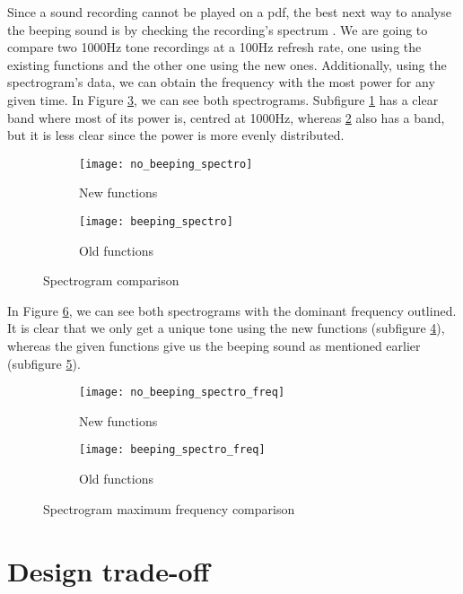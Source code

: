 Since a sound recording cannot be played on a pdf, the best next way to analyse the beeping sound is by checking the recording's spectrum . We are going to compare two 1000Hz tone recordings at a 100Hz refresh rate, one using the existing functions and the other one using the new ones. Additionally, using the spectrogram's data, we can obtain the frequency with the most power for any given time.
In Figure \ref{fig:spectro}, we can see both spectrograms. Subfigure \ref{fig:spectro_no_beep} has a clear band where most of its power is, centred at 1000Hz, whereas \ref{fig:spectro_beep} also has a band, but it is less clear since the power is more evenly distributed.
\begin{figure}[hbt!]
	\centering
	\begin{subfigure}{0.48\linewidth}
		\centering
		\texttt{[image: no\_beeping\_spectro]}
		\caption{New functions}
		\label{fig:spectro_no_beep}
	\end{subfigure}
	\begin{subfigure}{0.48\linewidth}
		\centering
		\texttt{[image: beeping\_spectro]}
		\caption{Old functions}
		\label{fig:spectro_beep}
	\end{subfigure}
	\caption{Spectrogram comparison}
	\label{fig:spectro}
\end{figure}

In Figure \ref{fig:spectro_freq}, we can see both spectrograms with the dominant frequency outlined. It is clear that we only get a unique tone using the new functions (subfigure \ref{fig:spectro_freq_no_beep}), whereas the given functions give us the beeping sound as mentioned earlier (subfigure \ref{fig:spectro_freq_beep}).

\begin{figure}[hbt!]
	\centering
	\begin{subfigure}{0.48\linewidth}
		\centering
		\texttt{[image: no\_beeping\_spectro\_freq]}
		\caption{New functions}
		\label{fig:spectro_freq_no_beep}
	\end{subfigure}
	\begin{subfigure}{0.48\linewidth}
		\centering
		\texttt{[image: beeping\_spectro\_freq]}
		\caption{Old functions}
		\label{fig:spectro_freq_beep}
	\end{subfigure}
	\caption{Spectrogram maximum frequency comparison}
	\label{fig:spectro_freq}
\end{figure}


\section{Design trade-off}

